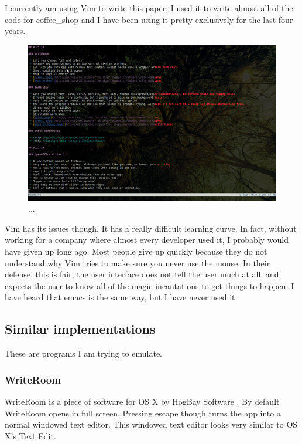 \documentclass[10pt]{article}
\begin{document}
I currently am using Vim to write this paper, I used it to write almost all of the code for coffee\_shop and I have been using it pretty exclusively for the last four years.

\begin{figure}
   \centering
      \includegraphics[width=130mm]{images/vim3.png}
   \caption{...}
\end{figure}

Vim has its issues though. It has a really difficult learning curve. In fact, without working for a company where almost every developer used it, I probably would have given up long ago. Most people give up quickly because they do not understand why Vim tries to make sure you never use the mouse. In their defense, this is fair, the user interface does not tell the user much at all, and expects the user to know all of the magic incantations to get things to happen. I have heard that emacs is the same way, but I have never used it.

\subsection{Similar implementations}

These are programs I am trying to emulate.

\subsubsection{WriteRoom}

WriteRoom is a piece of software for OS X by HogBay Software \cite{writeroom}. By default WriteRoom opens in full screen. Pressing escape though turns the app into a normal windowed text editor. This windowed text editor looks very similar to OS X's Text Edit.
\end{document}

